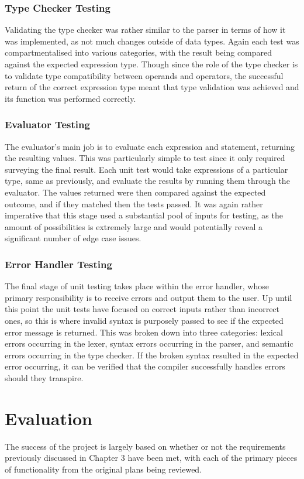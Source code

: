 \documentclass[
]{report}
\begin{document}
\subsection{Type Checker Testing}
Validating the type checker was rather similar to the parser in terms of
how it was implemented, as not much changes outside of data types. Again
each test was compartmentalised into various categories, with the result
being compared against the expected \gls{expression} type. Though since the
role of the type checker is to validate type compatibility between
operands and operators, the successful return of the correct \gls{expression}
type meant that type validation was achieved and its function was
performed correctly.

\subsection{Evaluator Testing}
The evaluator's main job is to evaluate each \gls{expression} and \gls{statement},
returning the resulting values. This was particularly simple to test
since it only required surveying the final result. Each unit test would
take \glspl{expression} of a particular type, same as previously, and evaluate
the results by running them through the evaluator. The values returned
were then compared against the expected outcome, and if they matched
then the tests passed. It was again rather imperative that this stage
used a substantial pool of inputs for testing, as the amount of
possibilities is extremely large and would potentially reveal a
significant number of edge case issues.

\subsection{Error Handler Testing}
The final stage of unit testing takes place within the error handler,
whose primary responsibility is to receive errors and output them to the
user. Up until this point the unit tests have focused on correct inputs
rather than incorrect ones, so this is where invalid syntax is purposely
passed to see if the expected error message is returned. This was broken
down into three categories: lexical errors occurring in the lexer,
syntax errors occurring in the parser, and semantic errors occurring in
the type checker. If the broken syntax resulted in the expected error
occurring, it can be verified that the compiler successfully handles
errors should they transpire.

\chapter{Evaluation}
The success of the project is largely based on whether or not the
requirements previously discussed in Chapter 3 have been met, with each
of the primary pieces of functionality from the original plans being
reviewed.
\end{document}
